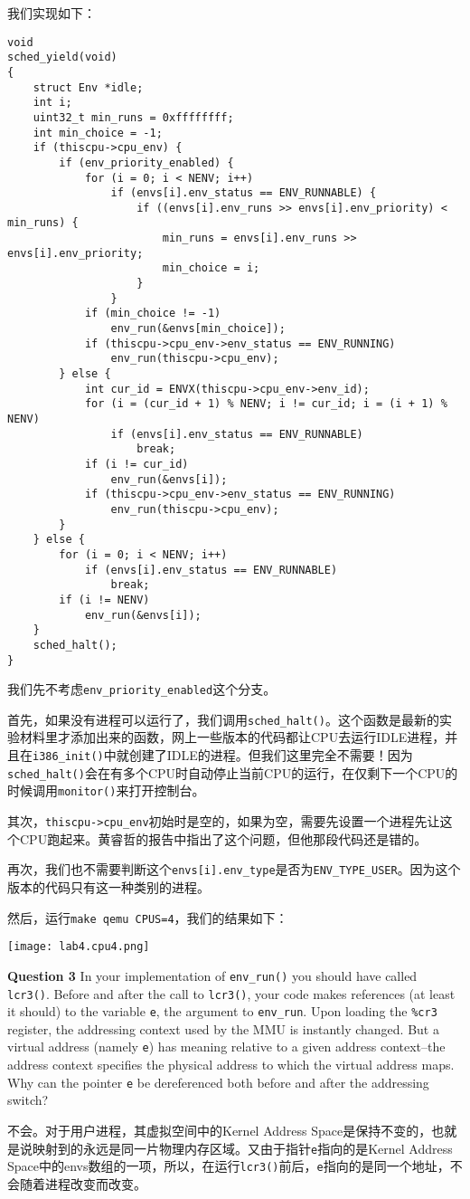 \documentclass[11pt]{article}
\begin{document}
我们实现如下：
\begin{lstlisting}[title=kern/sched.c]
void
sched_yield(void)
{
	struct Env *idle;
	int i;
	uint32_t min_runs = 0xffffffff;
	int min_choice = -1;
	if (thiscpu->cpu_env) {
		if (env_priority_enabled) {
			for (i = 0; i < NENV; i++)
				if (envs[i].env_status == ENV_RUNNABLE) {
					if ((envs[i].env_runs >> envs[i].env_priority) < min_runs) {
						min_runs = envs[i].env_runs >> envs[i].env_priority;
						min_choice = i;
					}
				}
			if (min_choice != -1)
				env_run(&envs[min_choice]);
			if (thiscpu->cpu_env->env_status == ENV_RUNNING)
				env_run(thiscpu->cpu_env);
		} else {
			int cur_id = ENVX(thiscpu->cpu_env->env_id);
			for (i = (cur_id + 1) % NENV; i != cur_id; i = (i + 1) % NENV)
				if (envs[i].env_status == ENV_RUNNABLE)
					break;
			if (i != cur_id)
				env_run(&envs[i]);
			if (thiscpu->cpu_env->env_status == ENV_RUNNING)
				env_run(thiscpu->cpu_env);
		}
	} else {
		for (i = 0; i < NENV; i++)
			if (envs[i].env_status == ENV_RUNNABLE)
				break;
		if (i != NENV)
			env_run(&envs[i]);
	}
	sched_halt();
}
\end{lstlisting}
我们先不考虑\lstinline|env_priority_enabled|这个分支。

首先，如果没有进程可以运行了，我们调用\lstinline|sched_halt()|。这个函数是最新的实验材料里才添加出来的函数，网上一些版本的代码都让CPU去运行IDLE进程，并且在\lstinline|i386_init()|中就创建了IDLE的进程。但我们这里完全不需要！因为\lstinline|sched_halt()|会在有多个CPU时自动停止当前CPU的运行，在仅剩下一个CPU的时候调用\lstinline|monitor()|来打开控制台。

其次，\lstinline|thiscpu->cpu_env|初始时是空的，如果为空，需要先设置一个进程先让这个CPU跑起来。黄睿哲的报告中指出了这个问题，但他那段代码还是错的。

再次，我们也不需要判断这个\lstinline|envs[i].env_type|是否为\lstinline|ENV_TYPE_USER|。因为这个版本的代码只有这一种类别的进程。

然后，运行\lstinline|make qemu CPUS=4|，我们的结果如下：
\begin{center}
\texttt{[image: lab4.cpu4.png]}
\end{center}

\begin{framed}
\noindent\textbf{Question 3} In your implementation of \lstinline|env_run()| you should have called \lstinline|lcr3()|. Before and after the call to \lstinline|lcr3()|, your code makes references (at least it should) to the variable \lstinline|e|, the argument to \lstinline|env_run|. Upon loading the \lstinline|%cr3| register, the addressing context used by the MMU is instantly changed. But a virtual address (namely \lstinline|e|) has meaning relative to a given address context--the address context specifies the physical address to which the virtual address maps. Why can the pointer \lstinline|e| be dereferenced both before and after the addressing switch?
\end{framed}
不会。对于用户进程，其虚拟空间中的Kernel Address Space是保持不变的，也就是说映射到的永远是同一片物理内存区域。又由于指针\lstinline|e|指向的是Kernel Address Space中的envs数组的一项，所以，在运行\lstinline|lcr3()|前后，\lstinline|e|指向的是同一个地址，不会随着进程改变而改变。
\end{document}
